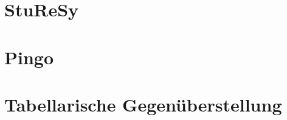 \section{StuReSy}
\label{chap:sturesy}

%
\section{Pingo}
\label{chap:pingo}

%
\section{Tabellarische Gegenüberstellung}
\label{chap:tabelle}

